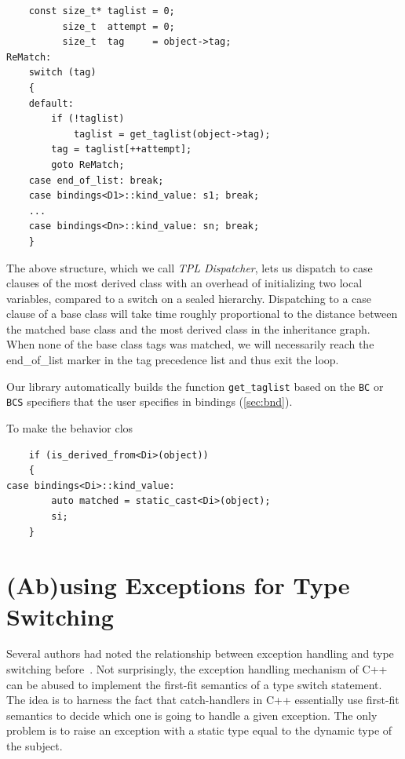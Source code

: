 \documentclass[preprint]{sigplanconf}
\makeatletter
\DeclareRobustCommand{\code}[1]{{\lstinline[breaklines=false,escapechar=@]{#1}}}
\makeatother
\begin{document}
\begin{lstlisting}
    const size_t* taglist = 0;
          size_t  attempt = 0;
          size_t  tag     = object->tag;
ReMatch:
    switch (tag) 
    {
    default:
        if (!taglist) 
            taglist = get_taglist(object->tag);
        tag = taglist[++attempt];
        goto ReMatch;
    case end_of_list: break;
    case bindings<D1>::kind_value: s1; break;
    ...
    case bindings<Dn>::kind_value: sn; break;
    }
\end{lstlisting}

\noindent
The above structure, which we call \emph{TPL Dispatcher}, lets us dispatch to case clauses of the most derived class 
with an overhead of initializing two local variables, compared to a switch on a 
sealed hierarchy. Dispatching to a case clause of a base class will take time 
roughly proportional to the distance between the matched base class and the most 
derived class in the inheritance graph. When none of the base class tags was 
matched, we will necessarily reach the end\_of\_list marker in the tag precedence 
list and thus exit the loop.

Our library automatically builds the function \code{get_taglist} based on the 
\code{BC} or \code{BCS} specifiers that the user specifies in bindings 
(\textsection\ref{sec:bnd}).

To make the behavior clos

\begin{lstlisting}
    if (is_derived_from<Di>(object))
    {
case bindings<Di>::kind_value:
        auto matched = static_cast<Di>(object); 
        si;
    }
\end{lstlisting}


\section{(Ab)using Exceptions for Type Switching}
\label{sec:xpm}

Several authors had noted the relationship between exception handling and type 
switching before~\cite{Glew99,ML2000}. Not surprisingly, the exception handling 
mechanism of C++ can be abused to implement the first-fit semantics of a type 
switch statement. The idea is to harness the fact that catch-handlers in C++ 
essentially use first-fit semantics to decide which one is going to handle a 
given exception. The only problem is to raise an exception with a static type 
equal to the dynamic type of the subject.
\end{document}
